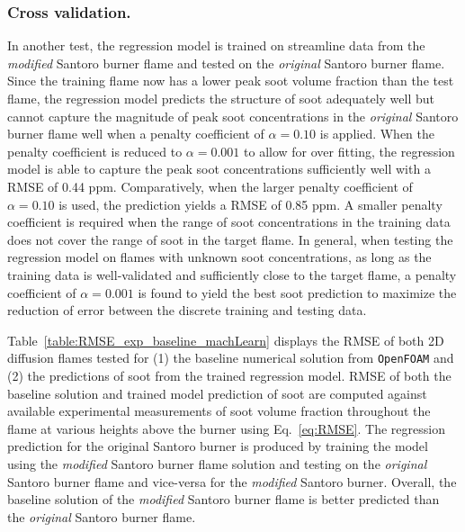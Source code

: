\documentclass[12pt]{CHT-20}
\begin{document}
\subsubsection{Cross validation.}
In another test, the regression model is trained on streamline data from the \emph{modified} Santoro burner flame and tested on the \emph{original} Santoro burner flame. Since the training flame now has a lower peak soot volume fraction than the test flame, the regression model predicts the structure of soot adequately well but cannot capture the magnitude of peak soot concentrations in the \emph{original} Santoro burner flame well when a penalty coefficient of $\alpha=0.10$ is applied. When the penalty coefficient is reduced to $\alpha=0.001$ to allow for over fitting, the regression model is able to capture the peak soot concentrations sufficiently well with a RMSE of 0.44 ppm. Comparatively, when the larger penalty coefficient of $\alpha=0.10$ is used, the prediction yields a RMSE of 0.85 ppm. A smaller penalty coefficient is required when the range of soot concentrations in the training data does not cover the range of soot in the target flame. In general, when testing the regression model on flames with unknown soot concentrations, as long as the training data is well-validated and sufficiently close to the target flame, a penalty coefficient of $\alpha=0.001$ is found to yield the best soot prediction to maximize the reduction of error between the discrete training and testing data.

Table~\ref{table:RMSE_exp_baseline_machLearn} displays the RMSE of both 2D diffusion flames tested for (1) the baseline numerical solution from \texttt{OpenFOAM} and (2) the predictions of soot from the trained regression model. RMSE of both the baseline solution and trained model prediction of soot are computed against available experimental measurements of soot volume fraction throughout the flame at various heights above the burner using Eq.~\ref{eq:RMSE}. The regression prediction for the original Santoro burner is produced by training the model using the \emph{modified} Santoro burner flame solution and testing on the \emph{original} Santoro burner flame and vice-versa for the \emph{modified} Santoro burner. Overall, the baseline solution of the \emph{modified} Santoro burner flame is better predicted than the \emph{original} Santoro burner flame.
 
\end{document}
